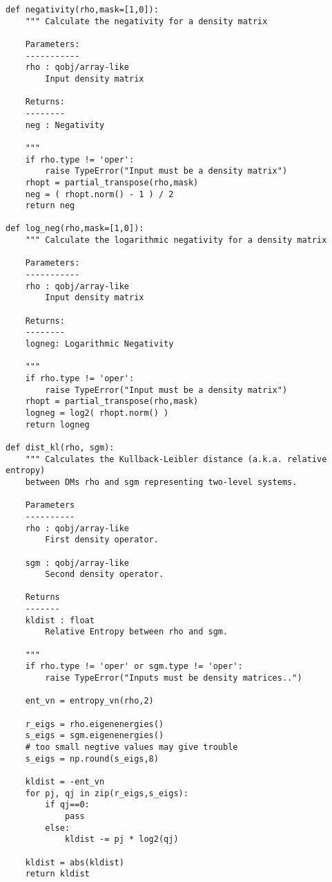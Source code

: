 \begin{verbatim}
def negativity(rho,mask=[1,0]):
    """ Calculate the negativity for a density matrix
    
    Parameters:
    -----------
    rho : qobj/array-like
        Input density matrix
    
    Returns:
    --------
    neg : Negativity
    
    """
    if rho.type != 'oper':
        raise TypeError("Input must be a density matrix")
    rhopt = partial_transpose(rho,mask)
    neg = ( rhopt.norm() - 1 ) / 2
    return neg

def log_neg(rho,mask=[1,0]):
    """ Calculate the logarithmic negativity for a density matrix
    
    Parameters:
    -----------
    rho : qobj/array-like
        Input density matrix
    
    Returns:
    --------
    logneg: Logarithmic Negativity
    
    """
    if rho.type != 'oper':
        raise TypeError("Input must be a density matrix")
    rhopt = partial_transpose(rho,mask)
    logneg = log2( rhopt.norm() )
    return logneg

def dist_kl(rho, sgm):
    """ Calculates the Kullback-Leibler distance (a.k.a. relative entropy)
    between DMs rho and sgm representing two-level systems.
    
    Parameters
    ----------
    rho : qobj/array-like
        First density operator.

    sgm : qobj/array-like
        Second density operator.

    Returns
    -------
    kldist : float
        Relative Entropy between rho and sgm.
    
    """
    if rho.type != 'oper' or sgm.type != 'oper':
        raise TypeError("Inputs must be density matrices..")
    
    ent_vn = entropy_vn(rho,2)
    
    r_eigs = rho.eigenenergies()
    s_eigs = sgm.eigenenergies()
    # too small negtive values may give trouble
    s_eigs = np.round(s_eigs,8)
    
    kldist = -ent_vn
    for pj, qj in zip(r_eigs,s_eigs):
        if qj==0:
            pass
        else:
            kldist -= pj * log2(qj)
            
    kldist = abs(kldist)
    return kldist

\end{verbatim}

